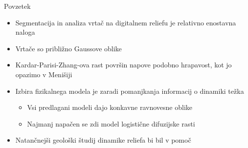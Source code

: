 \documentclass{beamer}
\begin{document}
\begin{frame}{Povzetek}
  \begin{itemize}
  \item<1->
    Segmentacija in analiza vrtač na digitalnem reliefu je relativno enostavna naloga
  \item<2->
    Vrtače so približno Gaussove oblike
  \item<3->
    Kardar-Parisi-Zhang-ova rast površin napove podobno hrapavost, kot jo opazimo v Menišiji
  \item<4->
    Izbira fizikalnega modela je zaradi pomanjkanja informacij o dinamiki težka
    \begin{itemize}
      \item<5->
        Vsi predlagani modeli dajo konkavne ravnovesne oblike
      \item<6->
        Najmanj napačen se zdi model logistične difuzijske rasti
    \end{itemize}
    \item<7->
      Natančnejši geološki študij dinamike reliefa bi bil v pomoč
  \end{itemize}
\end{frame}

\end{document}
